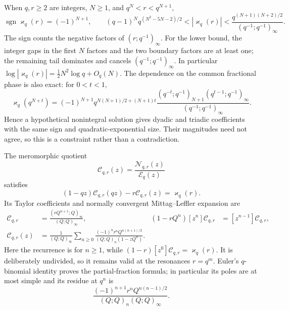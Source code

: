 \documentclass[11pt,oneside]{article}
\theoremstyle{definition}
\theoremstyle{remark}
\begin{document}
When $q,r\ge2$ are integers, $N\ge1$, and $q^N<r<q^{N+1}$,
\begin{equation}
 \operatorname{sgn}\varkappa_q(r)=(-1)^{N+1},
 \qquad
 (q-1)^Nq^{(N^2-5N-2)/2}
 <|\varkappa_q(r)|
 <\frac{q^{(N+1)(N+2)/2}}{(q^{-1};q^{-1})_\infty}.
 \label{arithinterp:eq-connection-amplification}
\end{equation}
The sign counts the negative factors of $(r;q^{-1})_\infty$.  For the lower bound, the
integer gaps in the first $N$ factors and the two boundary factors are at least one; the
remaining tail dominates and cancels $(q^{-1};q^{-1})_\infty$.  In particular
$\log|\varkappa_q(r)|=\tfrac12N^2\log q+O_q(N)$.  The dependence on the common fractional
phase is also exact: for $0<t<1$,
\begin{equation}
 \varkappa_q(q^{N+t})=(-1)^{N+1}q^{N(N+1)/2+(N+1)t}
 \frac{(q^{-t};q^{-1})_{N+1}(q^{t-1};q^{-1})_\infty}
 {(q^{-1};q^{-1})_\infty}.
 \label{arithinterp:eq-connection-phase}
\end{equation}
Hence a hypothetical nonintegral solution gives dyadic and triadic coefficients with the
same sign and quadratic-exponential size.  Their magnitudes need not agree, so this is a
constraint rather than a contradiction.

The meromorphic quotient
\begin{equation}
 \mathcal C_{q,r}(z)=\frac{\mathcal N_{q,r}(z)}{\mathcal E_q(z)}
 \label{arithinterp:eq-connection-quotient}
\end{equation}
satisfies
\begin{equation}
 (1-qz)\mathcal C_{q,r}(qz)-r\mathcal C_{q,r}(z)=\varkappa_q(r).
 \label{arithinterp:eq-connection-equation}
\end{equation}
Its Taylor coefficients and normally convergent Mittag--Leffler expansion are
\begin{align}
 [z^n]\mathcal C_{q,r}
 &=\frac{(rQ^{n+1};Q)_\infty}{(Q;Q)_\infty},
 & (1-rQ^n)[z^n]\mathcal C_{q,r}&=[z^{n-1}]\mathcal C_{q,r},
 \label{arithinterp:eq-connection-taylor}\\
 \mathcal C_{q,r}(z)
 &=\frac1{(Q;Q)_\infty}
 \sum_{n\ge0}\frac{(-1)^nr^nQ^{n(n+1)/2}}
 {(Q;Q)_n(1-zQ^n)}.
 \label{arithinterp:eq-connection-ML}
\end{align}
Here the recurrence is for $n\ge1$, while
$(1-r)[z^0]\mathcal C_{q,r}=\varkappa_q(r)$.  It is deliberately undivided, so it remains
valid at the resonances $r=q^m$.
Euler's $q$-binomial identity proves the partial-fraction formula; in particular its poles
are at most simple and its residue at $q^n$ is
\[
 \frac{(-1)^{n+1}r^nQ^{n(n-1)/2}}
 {(Q;Q)_n(Q;Q)_\infty}.
\]
\end{document}
